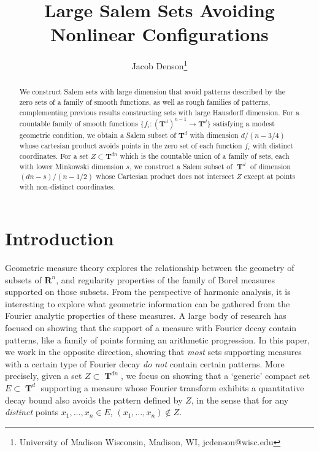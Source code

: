 \documentclass[dvipsnames,letterpaper,12pt]{article}
\title{Large Salem Sets Avoiding Nonlinear Configurations}
\author{Jacob Denson\footnote{University of Madison Wisconsin, Madison, WI, jcdenson@wisc.edu}}
\numberwithin{equation}{section}
\DeclareMathOperator{\TT}{\mathbf{T}}
\numberwithin{theorem}{section}
\begin{document}
\maketitle

\begin{abstract}
    We construct Salem sets with large dimension that avoid patterns described by the zero sets of a family of smooth functions, as well as rough families of patterns, complementing previous results constructing sets with large Hausdorff dimension. For a countable family of smooth functions $\{ f_i : (\mathbf{T}^d)^{n-1} \to \mathbf{T}^d \}$ satisfying a modest geometric condition, we obtain a Salem subset of $\mathbf{T}^d$ with dimension $d/(n-3/4)$ whose cartesian product avoids points in the zero set of each function $f_i$ with distinct coordinates. For a set $Z \subset \mathbf{T}^{dn}$ which is the countable union of a family of sets, each with lower Minkowski dimension $s$, we construct a Salem subset of $\TT^d$ of dimension $(dn - s)/(n - 1/2)$ whose Cartesian product does not intersect $Z$ except at points with non-distinct coordinates.
\end{abstract}

\section{Introduction}

Geometric measure theory explores the relationship between the geometry of subsets of $\mathbf{R}^n$, and regularity properties of the family of Borel measures supported on those subsets. From the perspective of harmonic analysis, it is interesting to explore what geometric information can be gathered from the Fourier analytic properties of these measures. A large body of research has focused on showing that the support of a measure with Fourier decay contain patterns, like a family of points forming an arithmetic progression. In this paper, we work in the opposite direction, showing that \emph{most} sets supporting measures with a certain type of Fourier decay \emph{do not} contain certain patterns. More precisely, given a set $Z \subset \TT^{dn}$, we focus on showing that a `generic' compact set $E \subset \TT^d$ supporting a measure whose Fourier transform exhibits a quantitative decay bound also avoids the pattern defined by $Z$, in the sense that for any \emph{distinct} points $x_1,\dots,x_n \in E$, $(x_1,\dots,x_n) \not \in Z$.

\end{document}
